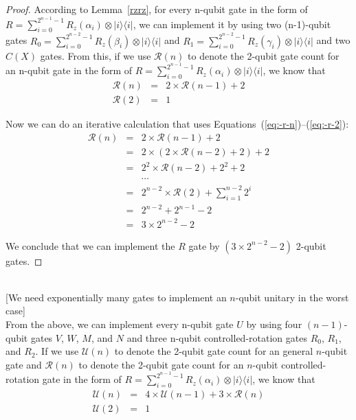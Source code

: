 \documentclass[11pt]{article}
\def\ket#1{|#1\rangle}
\def\bra#1{\langle#1|}
\def\outer#1#2{\ket{#1}\bra{#2}}
\begin{document}
\begin{proof}
According to Lemma~\ref{rzrz}, for every n-qubit gate in the form of $R = \sum^{2^{n-1}-1}_{i=0}R_{z}(\alpha_i) \otimes \outer{i}{i}$, we can implement it by using two (n-1)-qubit gates $R_0 = \sum^{2^{n-2}-1}_{i=0}R_{z}(\beta_i) \otimes \outer{i}{i}$ and $R_1 = \sum^{2^{n-2}-1}_{i=0}R_{z}(\gamma_i) \otimes \outer{i}{i}$ and two $C(X)$ gates. From this, if we use $\mathcal{R}(n)$ to denote the 2-qubit gate count for an n-qubit gate in the form of $R = \sum^{2^{n-1}-1}_{i=0}R_{z}(\alpha_i) \otimes \outer{i}{i}$,  we know that 
\begin{eqnarray}
\mathcal{R}(n) & = &  2 \times \mathcal{R}(n-1) + 2 
\label{eq:-r-n} \\
\mathcal{R}(2) & = & 1
\label{eq:-r-2} 
\end{eqnarray}

Now we can do an iterative calculation that uses
Equations~(\ref{eq:-r-n})--(\ref{eq:-r-2}):
\begin{eqnarray}
\mathcal{R}(n) & = &  2 \times \mathcal{R}(n-1) + 2 \nonumber \\ 
& = & 2 \times (2 \times \mathcal{R}(n-2) + 2) + 2 \nonumber \\ 
& = & 2^2 \times \mathcal{R}(n-2) + 2^2 + 2 \nonumber \\ 
&& \cdots \nonumber \\  
& = & 2^{n-2} \times \mathcal{R}(2) + \sum^{n-2}_{i=1}2^i \nonumber \\ 
& = & 2^{n-2} + 2^{n-1} - 2 \nonumber \\ 
& = & 3 \times 2^{n-2} - 2 \nonumber
\end{eqnarray}

We conclude that we can implement the $R$ gate by $(3 \times 2^{n-2} - 2)$ 2-qubit gates. 
\end{proof}


\mbox{} \\ \hspace*{1cm}
   [We need exponentially many gates to implement an $n$-qubit unitary in the worst case] \\
From the above, we can implement every n-qubit gate $U$ by using 
four $(n-1)$-qubit gates $V$, $W$, $M$, and $N$ and 
three n-qubit controlled-rotation gates $R_0$, $R_1$, and $R_2$. 
If we use $\mathcal{U}(n)$ to denote the 2-qubit gate count for 
an general $n$-qubit gate and $\mathcal{R}(n)$ to denote 
the 2-qubit gate count for an $n$-qubit controlled-rotation gate in 
the form of $R = \sum^{2^{n-1}-1}_{i=0}R_{z}(\alpha_i) \otimes \outer{i}{i}$,  
we know that 
\begin{eqnarray}
\mathcal{U}(n) & = & 4 \times \mathcal{U}(n-1) + 3 \times \mathcal{R}(n) 
\label{eq:u-n-with-r} \\
\mathcal{U}(2) & = & 1    
\label{eq:u-2}
\end{eqnarray}
\end{document}
